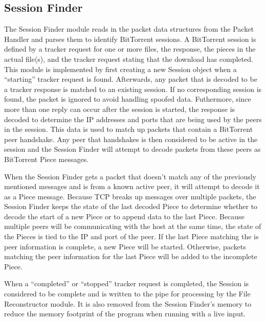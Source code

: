 \documentclass{acm_proc_article-sp}
\begin{document}
\subsection{Session Finder}
The Session Finder module reads in the packet data structures from the Packet
Handler and parses them to identify BitTorrent sessions. A BitTorrent session is
defined by a tracker request for one or more files, the response, the pieces in
the actual file(s), and the tracker request stating that the download has
completed. This module is implemented by first creating a new Session object
when a ``starting'' tracker request is found. Afterwards, any packet that is
decoded to be a tracker response is matched to an existing session.  If no
corresponding session is found, the packet is ignored to avoid handling spoofed
data.  Futhermore, since more than one reply can occur after the session is
started, the response is decoded to determine the IP addresses and ports that
are being used by the peers in the session. This data is used to match up
packets that contain a BitTorrent peer handshake. Any peer that handshakes is
then considered to be active in the session and the Session Finder will attempt
to decode packets from these peers as BitTorrent Piece messages.

When the Session Finder gets a packet that doesn't match any of the previously
mentioned messages and is from a known active peer, it will attempt to decode it
as a Piece message. Because TCP breaks up messages over multiple packets, the
Session Finder keeps the state of the last decoded Piece to determine whether to
decode the start of a new Piece or to append data to the last Piece. Because
multiple peers will be communicating with the host at the same time, the state
of the Pieces is tied to the IP and port of the peer. If the last Piece matching
the is peer information is complete, a new Piece will be started. Otherwise,
packets matching the peer information for the last Piece will be added to the
incomplete Piece.

When a ``completed'' or ``stopped'' tracker request is completed, the Session is
considered to be complete and is written to the pipe for processing by the File
Reconstructor module. It is also removed from the Session Finder's memory to
reduce the memory footprint of the program when running with a live input.
\end{document}
